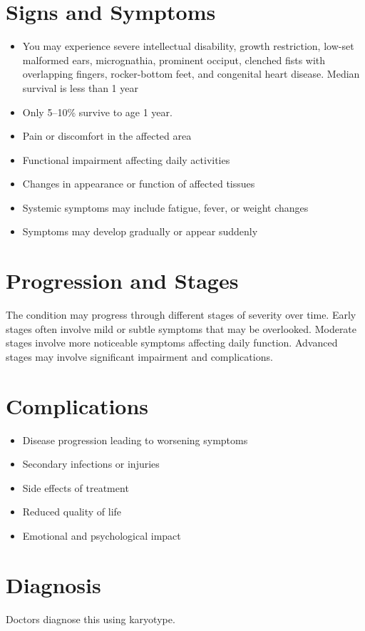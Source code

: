 \section{Signs and Symptoms}
\begin{itemize}[noitemsep]
  \item You may experience severe intellectual disability, growth restriction, low-set malformed ears, micrognathia, prominent occiput, clenched fists with overlapping fingers, rocker-bottom feet, and congenital heart disease. Median survival is less than 1 year
  \item Only 5--10\% survive to age 1 year.
  \item Pain or discomfort in the affected area
  \item Functional impairment affecting daily activities
  \item Changes in appearance or function of affected tissues
  \item Systemic symptoms may include fatigue, fever, or weight changes
  \item Symptoms may develop gradually or appear suddenly
\end{itemize}
\section{Progression and Stages}
The condition may progress through different stages of severity over time. Early stages often involve mild or subtle symptoms that may be overlooked. Moderate stages involve more noticeable symptoms affecting daily function. Advanced stages may involve significant impairment and complications.
\section{Complications}
\begin{itemize}[noitemsep]
  \item Disease progression leading to worsening symptoms
  \item Secondary infections or injuries
  \item Side effects of treatment
  \item Reduced quality of life
  \item Emotional and psychological impact
\end{itemize}
\section{Diagnosis}
Doctors diagnose this using karyotype.

